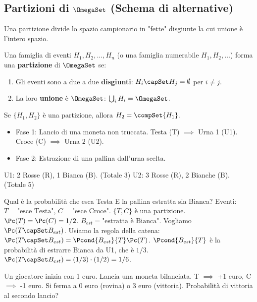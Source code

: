 \subsection{Partizioni di \texorpdfstring{$\OmegaSet$}{Omega} (Schema di alternative)}
Una partizione divide lo spazio campionario in "fette" disgiunte la cui unione è l'intero spazio.

\begin{definition}
Una famiglia di eventi $H_1, H_2, \dots, H_n$ (o una famiglia numerabile $H_1, H_2, \dots$) forma una \textbf{partizione} di $\OmegaSet$ se:
\begin{enumerate}
    \item Gli eventi sono a due a due \textbf{disgiunti}: $H_i \capSet H_j = \emptyset$ per $i \neq j$.
    \item La loro \textbf{unione} è $\OmegaSet$: $\bigcup_{i} H_i = \OmegaSet$.
\end{enumerate}
\end{definition}

\begin{remark}
Se $\{H_1, H_2\}$ è una partizione, allora $H_2 = \compSet{H_1}$.
\end{remark}

\begin{example}
\begin{itemize}
    \item Fase 1: Lancio di una moneta non truccata. Testa (T) $\implies$ Urna 1 (U1). Croce (C) $\implies$ Urna 2 (U2).
    \item Fase 2: Estrazione di una pallina dall'urna scelta.
\end{itemize}
U1: 2 Rosse (R), 1 Bianca (B). (Totale 3)
U2: 3 Rosse (R), 2 Bianche (B). (Totale 5)

Qual è la probabilità che esca Testa E la pallina estratta sia Bianca?
Eventi: $T = \text{"esce Testa"}$, $C = \text{"esce Croce"}$. $\{T,C\}$ è una partizione. $\Pc(T)=\Pc(C)=1/2$.
$B_{est} = \text{"estratta è Bianca"}$.
Vogliamo $\Pc(T \capSet B_{est})$.
Usiamo la regola della catena: $\Pc(T \capSet B_{est}) = \Pcond{B_{est}}{T} \Pc(T)$.
$\Pcond{B_{est}}{T}$ è la probabilità di estrarre Bianca da U1, che è $1/3$.
$\Pc(T \capSet B_{est}) = (1/3) \cdot (1/2) = 1/6$.
\end{example}

\begin{exercise}
Un giocatore inizia con 1 euro. Lancia una moneta bilanciata. T $\implies$ +1 euro, C $\implies$ -1 euro. Si ferma a 0 euro (rovina) o 3 euro (vittoria).
Probabilità di vittoria al secondo lancio?
\end{exercise}

